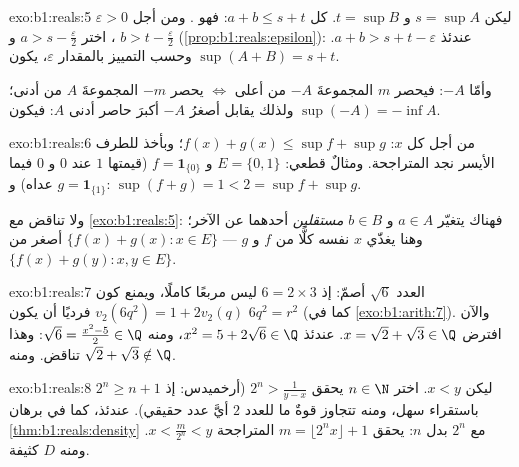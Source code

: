 \begin{solution}{exo:b1:reals:5}
ليكن $s = \sup A$ و $t = \sup B$. كل $a + b \leq s + t$: فهو . ومن أجل $\varepsilon > 0$، اختر $a > s - \frac\varepsilon2$ و
$b > t - \frac\varepsilon2$ (\cref{prop:b1:reals:epsilon}): عندئذ $a +
b > s + t - \varepsilon$. وحسب التمييز بالمقدار $\varepsilon$،
يكون $\sup(A+B) = s + t$.

وأمّا $-A$: فيحصر $m$ المجموعةَ $-A$ من أعلى $\iff$ يحصر $-m$ المجموعةَ $A$ من أدنى؛
ولذلك يقابل أصغرُ   $-A$ أكبرَ حاصر
أدنى  $A$: فيكون $\sup(-A) = -\inf A$.
\end{solution}

\begin{solution}{exo:b1:reals:6}
من أجل كل $x$: $f(x) + g(x) \leq \sup f + \sup g$؛ وبأخذ 
للطرف الأيسر نجد المتراجحة. ومثالٌ قطعي: $E = \{0, 1\}$ و
$f = \mathbf{1}_{\{0\}}$ (قيمتها $1$ عند $0$ و $0$ فيما عداه) و $g =
\mathbf{1}_{\{1\}}$: $\sup(f + g) = 1 < 2 = \sup f + \sup g$.

ولا تناقض مع \cref{exo:b1:reals:5}: فهناك يتغيّر $a \in A$ و $b
\in B$ \emph{مستقلين} أحدهما عن الآخر؛ وهنا يغذّي $x$ نفسه كلًّا من $f$
و $g$ ---  $\{f(x) + g(x) : x \in E\}$ أصغر من
 $\{f(x) + g(y) : x, y \in E\}$.
\end{solution}

\begin{solution}{exo:b1:reals:7}
العدد $\sqrt 6$ أصمّ: إذ $6 = 2 \times 3$ ليس مربعًا كاملًا،
ويمنع كون $v_2(6q^2) = 1 + 2v_2(q)$ فرديًا أن يكون $6q^2 = r^2$ (كما في
\cref{exo:b1:arith:7}). والآن افترض $x = \sqrt 2 + \sqrt 3 \in \Q$.
عندئذ $x^2 = 5 + 2\sqrt 6 \in \Q$، ومنه $\sqrt 6 = \frac{x^2 - 5}{2} \in
\Q$: وهذا تناقض. ومنه $\sqrt 2 + \sqrt 3 \notin \Q$.
\end{solution}

\begin{solution}{exo:b1:reals:8}
ليكن $x < y$. اختر $n \in \N$ يحقق $2^n > \frac{1}{y - x}$ (أرخميدس:
إذ $2^n \geq n + 1$ باستقراء سهل، ومنه تتجاوز قوةٌ ما للعدد $2$
أيَّ عدد حقيقي). عندئذ، كما في برهان \cref{thm:b1:reals:density} مع
$2^n$ بدل $n$: يحقق $m = \lfloor 2^n x \rfloor + 1$ المتراجحة $x <
\frac{m}{2^n} < y$. ومنه  $D$ كثيفة.
\end{solution}

